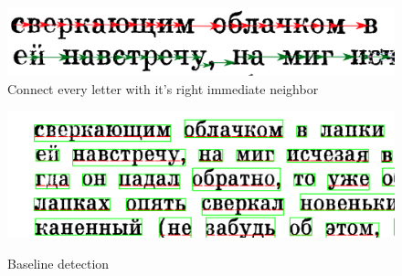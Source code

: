 \documentclass{article}
\begin{document}
\begin{figure}
	\includegraphics[scale=0.3]{connected_letters.png}
	\caption{Connect every letter with it's right immediate neighbor}
	\label{fig:connected_letters}
\end{figure}

\begin{figure}
\includegraphics[width=\textwidth]{baseline.png}
\label{fig:baseline}
\caption{Baseline detection}
\end{figure}

	
\end{document}
